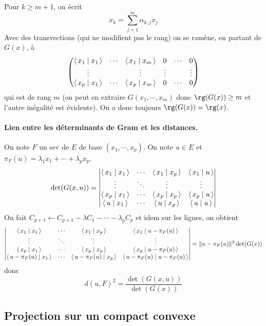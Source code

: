 Pour $k\geq m+1$, on écrit \[
    x_k=\sum_{j=1}^m \alpha_{k,j}x_j
\] 
Avec des transvections (qui ne modifient pas le rang) on se ramène, en partant de $G(x)$, à  \[
\begin{pmatrix}
    \scalar{x_1}{x_1} & \cdots  & \scalar{x_1}{x_m} & 0 & \cdots  & 0 \\
    \vdots &  & \vdots & \vdots & & \vdots\\
    \scalar{x_p}{x_1} &\cdots & \scalar{x_p}{x_m} &0 & \cdots & 0
\end{pmatrix}
\] 
qui est de rang $m$ (on peut en extraire $G(x_1, \cdots , x_m)$ donc $\rg(G(x))\geq m$ et l'autre inégalité est évidente). On a donc toujours $\rg (G(x))=\rg(x)$.


\paragraph{Lien entre les déterminants de Gram et les distances.}
On note $F$ un sev de  $E$ de base  $(x_1, \cdots , x_p)$. On note $u \in  E$ et $\pi_F(u)=\lambda_1 x_1+\cdots +\lambda_px_p$.
\[
    \det(G(x, u)) = \begin{vmatrix}
        \scalar{x_1}{x_1} & \cdots  & \scalar{x_1}{x_p} & \scalar{x_1}{u} \\
        \vdots & \ddots & \vdots & \vdots \\
        \scalar{x_p}{x_1} & \cdots  & \scalar{x_p}{x_p} & \scalar{x_p}{u} \\
        \scalar{u}{x_1} & \cdots  & \scalar{u}{x_p}  &\scalar{u}{u} 
    \end{vmatrix}
\] 
On fait $C_{p+1}\leftarrow C_{p+1}-\lambda C_1-\cdots -\lambda_p C_p$ et idem sur les lignes, on obtient  \[
\begin{vmatrix}
    \scalar{x_1}{x_1} & \cdots  & \scalar{x_1}{x_p} & \scalar{x_1}{u-\pi_F(u)} \\
        \vdots & \ddots & \vdots & \vdots \\
        \scalar{x_p}{x_1} & \cdots  & \scalar{x_p}{x_p} & \scalar{x_p}{u-\pi_F(u)} \\
        \scalar{u-\pi_F(u)}{x_1} & \cdots  & \scalar{u-\pi_F(u)}{x_p}  &\scalar{u-\pi_F(u)}{u-\pi_F(u)} 
    \end{vmatrix}=\|u-\pi_F(u)\|^2 \det(G(x))
\] 
donc \[
    d(u, F)^2 = \frac{\det(G(x, u))}{\det(G(x))}
\] 

\subsection{Projection sur un compact convexe}

